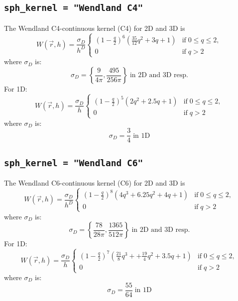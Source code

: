 \documentclass[notes.tex]{subfiles}
\begin{document}
\subsection{{\tt sph\_kernel = "Wendland C4"}}
The Wendland C4-continuous kernel (C4) for 2D and 3D is
\begin{equation}
W(\vec{r},h) = \frac{\sigma_D}{h^D} 
  \begin{cases}
    \left(1-\frac{q}{2} \right)^6 (\frac{35}{12}q^2+3q+1) & \text{if} \; 0 \leq q \leq 2, \\
    0        & \text{if} \;  q > 2 
\end{cases}
\end{equation}
where $\sigma_D$ is:
\begin{equation}
\sigma_D =  \left\{ \frac{9}{4 \pi}, \frac{495}{256\pi}\right\}
         \; \text{in 2D and 3D resp.}
\end{equation}
For 1D:
\begin{equation}
W(\vec{r},h) = \frac{\sigma_D}{h} 
  \begin{cases}
    \left(1-\frac{q}{2} \right)^5 (2q^2+2.5q+1) & \text{if} \; 0 \leq q \leq 2, \\
    0        & \text{if} \;  q > 2 
\end{cases}
\end{equation}
where $\sigma_D$ is:
\begin{equation}
\sigma_D =  \frac{3}{4}
         \; \text{in 1D}
 \end{equation}


\subsection{{\tt sph\_kernel = "Wendland C6"}}
The Wendland C6-continuous kernel (C6) for 2D and 3D is
\begin{equation}
W(\vec{r},h) = \frac{\sigma_D}{h^D} 
  \begin{cases}
    \left(1-\frac{q}{2} \right)^8 (4q^3+6.25q^2+4q+1) & \text{if} \; 0 \leq q \leq 2, \\
    0        & \text{if} \;  q > 2 
\end{cases}
\end{equation}
where $\sigma_D$ is:
\begin{equation}
\sigma_D =  \left\{ \frac{78}{28 \pi}, \frac{1365}{512\pi}\right\}
         \; \text{in 2D and 3D resp.}
\end{equation}
For 1D:
\begin{equation}
W(\vec{r},h) = \frac{\sigma_D}{h} 
  \begin{cases}
    \left(1-\frac{q}{2} \right)^7 (\frac{21}{8}q^3++\frac{19}{4}q^2+3.5q+1) & \text{if} \; 0 \leq q \leq 2, \\
    0        & \text{if} \;  q > 2 
\end{cases}
\end{equation}
where $\sigma_D$ is:
\begin{equation}
\sigma_D =  \frac{55}{64}
         \; \text{in 1D}
 \end{equation}
\end{document}
